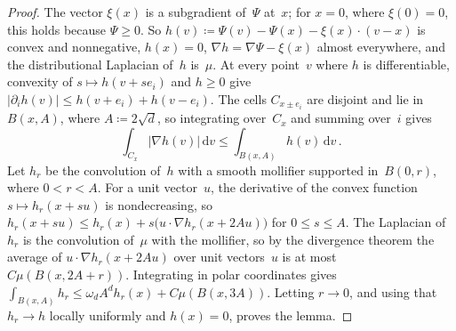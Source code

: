\documentclass[11pt]{amsart}
\theoremstyle{plain}
\theoremstyle{definition}
\newcommand{\gauge}{\Psi}
\newcommand{\dd}{\,\mathrm d}
\numberwithin{equation}{section}
\begin{document}
\begin{proof}
The vector $\xi(x)$ is a subgradient of~$\gauge$ at~$x$; for $x=0$, where $\xi(0)=0$, this holds because $\gauge\geq0$. So $h(v)\coloneqq \gauge(v)-\gauge(x)-\xi(x)\cdot(v-x)$ is convex and nonnegative, $h(x)=0$, $\nabla h=\nabla \gauge-\xi(x)$ almost everywhere, and the distributional Laplacian of~$h$ is~$\mu$. At every point~$v$ where $h$ is differentiable, convexity of $s\mapsto h(v+se_i)$ and $h\geq0$ give $|\partial_ih(v)|\leq h(v+e_i)+h(v-e_i)$. The cells $C_{x\pm e_i}$ are disjoint and lie in~$B(x,A)$, where $A\coloneqq2\sqrt d$, so integrating over~$C_x$ and summing over~$i$ gives
\begin{equation*}
\int_{C_x}|\nabla h(v)|\dd v\leq\int_{B(x,A)}h(v)\dd v\, .
\end{equation*}
Let $h_r$ be the convolution of~$h$ with a smooth mollifier supported in~$B(0,r)$, where $0<r<A$. For a unit vector~$u$, the derivative of the convex function $s\mapsto h_r(x+su)$ is nondecreasing, so $h_r(x+su)\leq h_r(x)+s\bigl(u\cdot\nabla h_r(x+2Au)\bigr)$ for $0\leq s\leq A$. The Laplacian of~$h_r$ is the convolution of~$\mu$ with the mollifier, so by the divergence theorem the average of $u\cdot\nabla h_r(x+2Au)$ over unit vectors~$u$ is at most $C\mu(B(x,2A+r))$. Integrating in polar coordinates gives $\int_{B(x,A)}h_r\leq\omega_dA^dh_r(x)+C\mu(B(x,3A))$. Letting $r\to0$, and using that $h_r\to h$ locally uniformly and $h(x)=0$, proves the lemma.
\end{proof}
\end{document}
